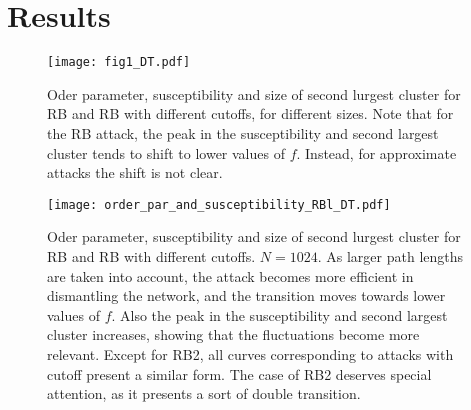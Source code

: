 \documentclass{article}
\begin{document}
\section{Results}



\begin{figure}
\centering
\texttt{[image: fig1\_DT.pdf]}
\caption{Oder parameter, susceptibility and size of second lurgest cluster for RB and RB with different cutoffs, for different sizes. Note that for the RB attack, the peak in the susceptibility and second largest cluster tends to shift to lower values of $f$. Instead, for approximate attacks the shift is not clear.}
\end{figure}

\begin{figure}
\centering
\texttt{[image: order\_par\_and\_susceptibility\_RBl\_DT.pdf]}
\caption{Oder parameter, susceptibility and size of second lurgest cluster for RB and RB with different cutoffs. $N = 1024$. As larger path lengths are taken into account, the attack becomes more efficient in dismantling the network, and the transition moves towards lower values of $f$. Also the peak in the susceptibility and second largest cluster increases, showing that the fluctuations become more relevant. Except for RB2, all curves corresponding to attacks with cutoff present a similar form. The case of RB2 deserves special attention, as it presents a sort of double transition.}
\end{figure}


\end{document}
